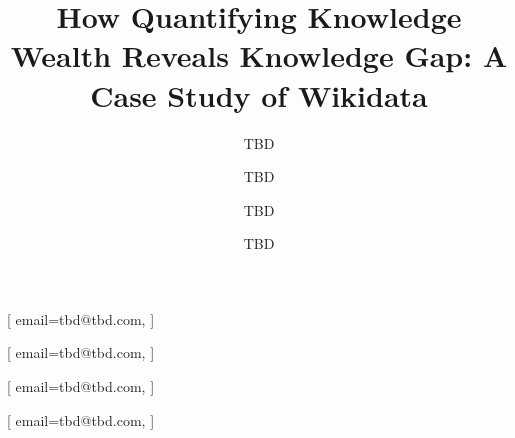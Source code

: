 \documentclass[
]{ceurart}
\begin{document}


\title{How Quantifying Knowledge Wealth Reveals Knowledge Gap: A Case Study of Wikidata}


\author[1]{TBD}[%
email=tbd@tbd.com,
]
\author[1]{TBD}[%
email=tbd@tbd.com,
]
\address[1]{TBD}

\author[2]{TBD}[%
email=tbd@tbd.com,
]
\address[2]{TBD}

\author[3]{TBD}[%
email=tbd@tbd.com,
]
\address[3]{TBD}

\end{document}
